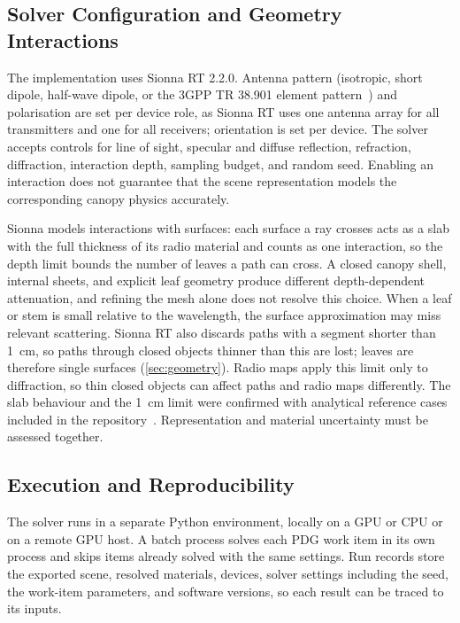 \subsection{Solver Configuration and Geometry Interactions}\label{sec:solver}
The implementation uses Sionna RT 2.2.0. Antenna pattern (isotropic, short dipole, half-wave dipole, or the 3GPP TR 38.901 element pattern~\cite{tr38901}) and polarisation are set per device role, as Sionna RT uses one antenna array for all transmitters and one for all receivers; orientation is set per device. The solver accepts controls for line of sight, specular and diffuse reflection, refraction, diffraction, interaction depth, sampling budget, and random seed. Enabling an interaction does not guarantee that the scene representation models the corresponding canopy physics accurately.

Sionna models interactions with surfaces: each surface a ray crosses acts as a slab with the full thickness of its radio material and counts as one interaction, so the depth limit bounds the number of leaves a path can cross. A closed canopy shell, internal sheets, and explicit leaf geometry produce different depth-dependent attenuation, and refining the mesh alone does not resolve this choice. When a leaf or stem is small relative to the wavelength, the surface approximation may miss relevant scattering. Sionna RT also discards paths with a segment shorter than \SI{1}{cm}, so paths through closed objects thinner than this are lost; leaves are therefore single surfaces (\cref{sec:geometry}). Radio maps apply this limit only to diffraction, so thin closed objects can affect paths and radio maps differently. The slab behaviour and the \SI{1}{cm} limit were confirmed with analytical reference cases included in the repository~\cite{housionna}. Representation and material uncertainty must be assessed together.

\subsection{Execution and Reproducibility}\label{sec:execution}
The solver runs in a separate Python environment, locally on a GPU or CPU or on a remote GPU host. A batch process solves each PDG work item in its own process and skips items already solved with the same settings. Run records store the exported scene, resolved materials, devices, solver settings including the seed, the work-item parameters, and software versions, so each result can be traced to its inputs.


